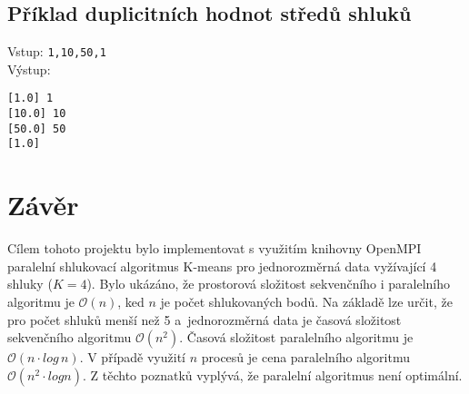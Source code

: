 \documentclass[a4paper, 11pt, fleqn]{scrartcl}
\begin{document}
    \subsection*{Příklad duplicitních hodnot středů shluků}
      Vstup: \texttt{1,10,50,1}\\
      Výstup:
      \begin{adjustwidth}{1em}{}
        \texttt{[1.0] 1}\\
        \texttt{[10.0] 10}\\
        \texttt{[50.0] 50}\\
        \texttt{[1.0]}
      \end{adjustwidth}

  \section{Závěr}
    Cílem tohoto projektu bylo implementovat s využitím knihovny OpenMPI paralelní shlukovací algoritmus K-means pro jednorozměrná data vyžívající 4 shluky ($K = 4$). Bylo ukázáno, že prostorová složitost sekvenčního i paralelního algoritmu je $\mathcal{O}(n)$, ked $n$ je počet shlukovaných bodů. Na základě \cite{fast} lze určit, že pro počet shluků menší než 5 a~jednorozměrná data je časová složitost sekvenčního algoritmu $\mathcal{O}(n^2)$. Časová složitost paralelního algoritmu je $\mathcal{O}(n\cdot log\, n)$. V případě využití $n$ procesů je cena paralelního algoritmu $\mathcal{O}(n^2\cdot log n)$. Z těchto poznatků vyplývá, že paralelní algoritmus není optimální.

  
  
\end{document}
